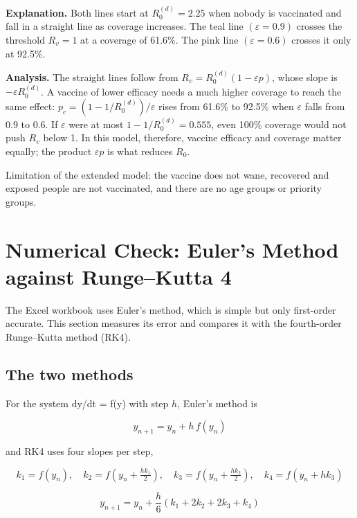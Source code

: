 \documentclass[12pt,a4paper]{article}
\theoremstyle{definition}
\begin{document}
\textbf{Explanation. }Both lines start at $R_{0}^{(d)} = 2.25$ when nobody is vaccinated and fall in a straight line as coverage increases. The teal line $(\varepsilon = 0.9)$ crosses the threshold $R_{v} = 1$ at a coverage of 61.6\%. The pink line $(\varepsilon = 0.6)$ crosses it only at 92.5\%.


\textbf{Analysis. }The straight lines follow from $R_{v} = R_{0}^{(d)}(1 - \varepsilon p)$, whose slope is $-\varepsilon R_{0}^{(d)}$. A vaccine of lower efficacy needs a much higher coverage to reach the same effect: $p_{c} = (1 - 1/R_{0}^{(d)})/\varepsilon$ rises from 61.6\% to 92.5\% when $\varepsilon$ falls from 0.9 to 0.6. If $\varepsilon$ were at most $1 - 1/R_{0}^{(d)} = 0.555$, even 100\% coverage would not push $R_{v}$ below 1. In this model, therefore, vaccine efficacy and coverage matter equally; the product $\varepsilon p$ is what reduces $R_{0}$.


Limitation of the extended model: the vaccine does not wane, recovered and exposed people are not vaccinated, and there are no age groups or priority groups.


\section{Numerical Check: Euler's Method against Runge–Kutta 4}

The Excel workbook uses Euler's method, which is simple but only first-order accurate. This section measures its error and compares it with the fourth-order Runge–Kutta method (RK4).


\subsection{The two methods}

For the system dy/dt = f(y) with step $h$, Euler's method is


\begin{equation}
y_{n+1} = y_n + h\,f(y_n)
\end{equation}

and RK4 uses four slopes per step,


\begin{equation}
k_1 = f(y_n),\quad k_2 = f\!\left(y_n+\tfrac{h k_1}{2}\right),\quad k_3 = f\!\left(y_n+\tfrac{h k_2}{2}\right),\quad k_4 = f(y_n+h k_3)
\end{equation}

\begin{equation}
y_{n+1} = y_n + \frac{h}{6}\left(k_1+2k_2+2k_3+k_4\right)
\end{equation}
\end{document}
